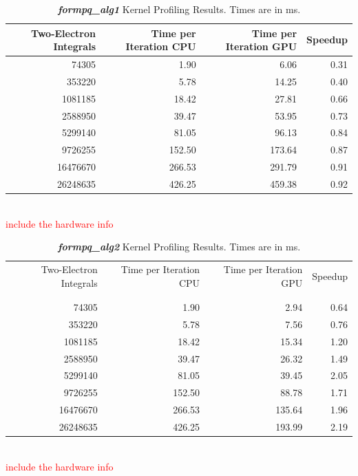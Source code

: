 \documentclass[12pt]{report}
\newcommand{\notetodylan}[1]{\textcolor{red}{#1}} %
\newcommand{\kernel}[1]{\textit{\textbf{#1}}}
\begin{document}
\begin{table}[h!]
\caption[\kernel{formpq\_alg1} Kernel Profiling Results.]{\kernel{formpq\_alg1} Kernel Profiling Results. Times are in ms.}
\label{tab:PQprofalg1}
\begin{tabular}{rrrr}
	Two-Electron Integrals	&	Time per Iteration CPU	&	Time per Iteration GPU	&	Speedup	\\
	\hline
	74305	&	1.90		&	6.06		&	0.31		\\
	353220	&	5.78		&	14.25	&	0.40		\\
	1081185	&	18.42	&	27.81	&	0.66		\\
	2588950	&	39.47	&	53.95	&	0.73		\\
	5299140	&	81.05	&	96.13	&	0.84		\\
	9726255	&	152.50	&	173.64	&	0.87		\\
	16476670	&	266.53	&	291.79	&	0.91		\\
	26248635	&	426.25	&	459.38	&	0.92		\\
\end{tabular}\\
\notetodylan{include the hardware info}
\end{table}

\begin{table}[h!]
\caption[\kernel{formpq\_alg2} Kernel Profiling Results.]{\kernel{formpq\_alg2} Kernel Profiling Results. Times are in ms.}
\label{tab:PQprofalg2}
\begin{tabular}{rrrr}
	Two-Electron Integrals	&	Time per Iteration CPU		&	Time per Iteration GPU	&	Speedup	\\
	\\
	\\
	\hline
	74305	&	1.90		&	2.94		&	0.64	\\
	353220	&	5.78		&	7.56		&	0.76	\\
	1081185	&	18.42	&	15.34	&	1.20	\\
	2588950	&	39.47	&	26.32	&	1.49	\\
	5299140	&	81.05	&	39.45	&	2.05	\\
	9726255	&	152.50	&	88.78	&	1.71	\\
	16476670	&	266.53	&	135.64	&	1.96	\\
	26248635	&	426.25	&	193.99	&	2.19	\\
\end{tabular}\\
\notetodylan{include the hardware info}
\end{table}
\end{document}

